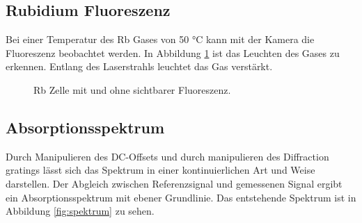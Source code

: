 \subsection{Rubidium Fluoreszenz}
Bei einer Temperatur des Rb Gases von 50 °C kann mit der Kamera die Fluoreszenz beobachtet werden.
In Abbildung \ref{fig:rb_fluoreszenz} ist das Leuchten des Gases zu erkennen.
Entlang des Laserstrahls leuchtet das Gas verstärkt.
\begin{figure}
    \centering
    \hfill
    \caption{Rb Zelle mit und ohne sichtbarer Fluoreszenz.}\label{fig:rb_fluoreszenz}
\end{figure}

\subsection{Absorptionsspektrum}
Durch Manipulieren des DC-Offsets und durch manipulieren des Diffraction gratings
lässt sich das Spektrum in einer kontinuierlichen Art und Weise darstellen. %
Der Abgleich zwischen Referenzsignal und gemessenen Signal ergibt ein Absorptionsspektrum mit ebener Grundlinie.
Das entstehende Spektrum ist in Abbildung \ref{fig:spektrum} zu sehen.

